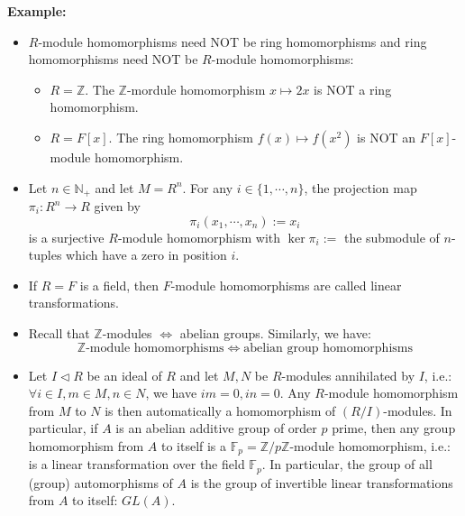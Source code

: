 \noindent\textbf{Example:} 
\begin{itemize}
    \item $R$-module homomorphisms need NOT be ring homomorphisms and ring homomorphisms need NOT be $R$-module homomorphisms:
    \begin{itemize}
        \item $R=\mathbb{Z}$. The $\mathbb{Z}$-mordule homomorphism $x \mapsto 2x$ is NOT a ring homomorphism.
        \item $R=F[x]$. The ring homomorphism $f(x) \mapsto f(x^2)$ is NOT an $F[x]$-module homomorphism.
    \end{itemize}

    \item Let $n \in \mathbb{N}_+$ and let $M =R^n$. For any $i \in \{1 ,\cdots, n\}$, the projection map $\pi_i:R^n \to R$ given by
    $$\pi_i (x_1 ,\cdots, x_n) := x_i$$
    is a surjective $R$-module homomorphism with $\ker \pi_i :=$ the submodule of $n$-tuples which have a zero in position $i$.

    \item If $R=F$ is a field, then $F$-module homomorphisms are called linear transformations.
    \item Recall that $\mathbb{Z}$-modules $\Leftrightarrow$ abelian groups. Similarly, we have:
    \[ \mathbb{Z} \text{-module homomorphisms} \Leftrightarrow \text{abelian group homomorphisms} \]

    \item Let $I \triangleleft R$ be an ideal of $R$ and let $M,N$ be $R$-modules annihilated by $I$, i.e.: $\forall i\in I,m\in M,n\in N$, we have $im=0,in=0$. Any $R$-module homomorphism from $M$ to $N$ is then automatically a homomorphism of $(R/I)$-modules. In particular, if $A$ is an abelian additive group of order $p$ prime, then any group homomorphism from $A$ to itself is a $\mathbb{F}_p = \mathbb{Z}/p\mathbb{Z}$-module homomorphism, i.e.: is a linear transformation over the field $\mathbb{F}_p$. In particular, the group of all (group) automorphisms of $A$ is the group of invertible linear transformations from $A$ to itself: $GL(A)$.
\end{itemize}

